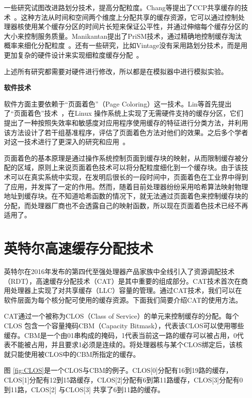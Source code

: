 一些研究试图改进路划分技术，提高分配粒度。Chang等提出了CCP共享缓存的技术~\parencite{chang2006cooperative,chang2014cooperative}。这种方法从时间和空间两个维度上分配共享的缓存资源，它可以通过控制处理器核使用某个缓存分区的时间片长短来保证公平性，并通过伸缩每个缓存分区的大小来控制服务质量。Manikantan提出了PriSM技术，通过精确地控制缓存淘汰概率来细化分配粒度~\parencite{manikantan2012probabilistic}。还有一些研究，比如Vintage没有采用路划分技术，而是用更加复杂的硬件设计来实现细粒度缓存分配~\parencite{sanchez2011vantage}。

上述所有研究都需要对硬件进行修改，所以都是在模拟器中进行模拟实验。

\textbf{软件技术}

软件方面主要依赖于“页面着色”（Page Coloring）这一技术。Lin等首先提出了“页面着色”技术~\parencite{lin2008gaining}，在Linux 操作系统上实现了无需硬件支持的缓存分区，它们提出了一种按照失效率和敏感度对应用程序使用缓存的特征进行分类方法，并利用该方法设计了若干组基准程序，评估了页面着色方法对他们的效果。之后多个学者对这一技术进行了更深入的研究和应用~\parencite{zhang2009towards,soares2008reducing,tam2007managing,azimi2009enhancing,lu2009soft}。

页面着色的基本原理是通过操作系统控制页面到缓存块的映射，从而限制缓存被分配的区域，原则上来说页面着色技术可以将分配粒度细化到一个缓存块。由于该技术可以在真实系统中实现，在发明后很长的一段时间中，页面着色在工业界中得到了应用，并发挥了一定的作用。然而，随着目前处理器纷纷采用哈希算法映射物理地址到缓存块。在不知道哈希函数的情况下，就无法通过页面着色来控制缓存块的分配，而处理器厂商也不会透露自己的映射函数，所以现在页面着色技术已经不再适用了。
   

\section{英特尔高速缓存分配技术}
英特尔在2016年发布的第四代至强处理器产品家族中全线引入了资源调配技术（RDT），高速缓存分配技术（CAT）是其中重要的组成部分。CAT技术首次在商用处理器上实现了对共享缓存（LLC）容量的管理。通过CAT技术，我们可以在软件层面为每个核分配可使用的缓存资源。下面我们简要介绍CAT的使用方法。

CAT通过一个被称为CLOS（Class of Service）的单元来控制缓存的分配。每个CLOS 包含一个容量掩码CBM（Capacity Bitmask），代表该CLOS可以使用哪些缓存。CBM是一个由01串构成的掩码，1代表当前这一路的缓存可以被占用，0代表不能被占用，并且要求1必须是连续的。将处理器核与某个CLOS绑定后，该核就只能使用被CLOS中的CBM所指定的缓存。

图 \ref{fig:CLOS}是一个CLOS与CBM的例子。CLOS[0]分配有16到19路的缓存，CLOS[1]分配有12到15路缓存，CLOS[2]分配有6到第11路缓存，CLOS[3]分配有0到11路，CLOS[2] 与CLOS[3] 共享了6到11路的缓存。

